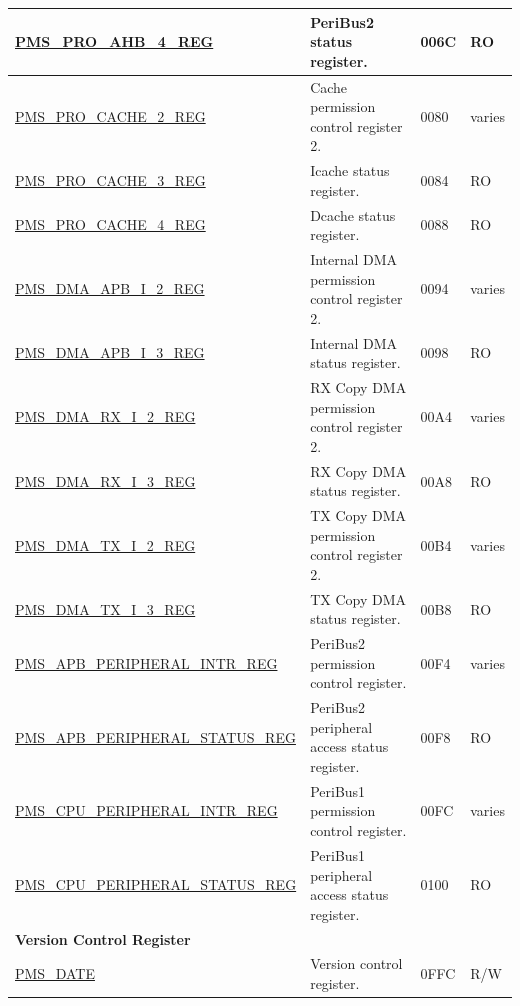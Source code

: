 \begin{longtable}{ |m{6cm} |m{7.2cm} | m{1.3cm} |m{1cm} | }
\hyperref[regdesc:PMSPROAHB4REG]{PMS\_PRO\_AHB\_4\_REG} & PeriBus2 status register. & \hexprefix{}006C & RO \\ \hline
\hyperref[regdesc:PMSPROCACHE2REG]{PMS\_PRO\_CACHE\_2\_REG} & Cache permission control register 2. & \hexprefix{}0080 & varies \\ \hline
\hyperref[regdesc:PMSPROCACHE3REG]{PMS\_PRO\_CACHE\_3\_REG} & Icache status register. & \hexprefix{}0084 & RO \\ \hline
\hyperref[regdesc:PMSPROCACHE4REG]{PMS\_PRO\_CACHE\_4\_REG} & Dcache status register. & \hexprefix{}0088 & RO \\ \hline
\hyperref[regdesc:PMSDMAAPBI2REG]{PMS\_DMA\_APB\_I\_2\_REG} & Internal DMA permission control register 2. & \hexprefix{}0094 & varies \\ \hline
\hyperref[regdesc:PMSDMAAPBI3REG]{PMS\_DMA\_APB\_I\_3\_REG} & Internal DMA status register. & \hexprefix{}0098 & RO \\ \hline
\hyperref[regdesc:PMSDMARXI2REG]{PMS\_DMA\_RX\_I\_2\_REG} & RX Copy DMA permission control register 2. & \hexprefix{}00A4 & varies \\ \hline
\hyperref[regdesc:PMSDMARXI3REG]{PMS\_DMA\_RX\_I\_3\_REG} & RX Copy DMA status register. & \hexprefix{}00A8 & RO \\ \hline
\hyperref[regdesc:PMSDMATXI2REG]{PMS\_DMA\_TX\_I\_2\_REG} & TX Copy DMA permission control register 2. & \hexprefix{}00B4 & varies \\ \hline
\hyperref[regdesc:PMSDMATXI3REG]{PMS\_DMA\_TX\_I\_3\_REG} & TX Copy DMA status register. & \hexprefix{}00B8 & RO \\ \hline
\hyperref[regdesc:PMSAPBPERIPHERALINTRREG]{PMS\_APB\_PERIPHERAL\_INTR\_REG} & PeriBus2 permission control register. & \hexprefix{}00F4 & varies \\ \hline
\hyperref[regdesc:PMSAPBPERIPHERALSTATUSREG]{PMS\_APB\_PERIPHERAL\_STATUS\_REG} & PeriBus2 peripheral access status register. & \hexprefix{}00F8 & RO \\ \hline
\hyperref[regdesc:PMSCPUPERIPHERALINTRREG]{PMS\_CPU\_PERIPHERAL\_INTR\_REG} & PeriBus1 permission control register. & \hexprefix{}00FC & varies \\ \hline
\hyperref[regdesc:PMSCPUPERIPHERALSTATUSREG]{PMS\_CPU\_PERIPHERAL\_STATUS\_REG} & PeriBus1 peripheral access status register. & \hexprefix{}0100 & RO \\ \hline
\multicolumn{4}{|l|}{\textbf{Version Control Register}} \\ \hline
\hyperref[regdesc:PMSDATEREG]{PMS\_DATE} & Version control register. & \hexprefix{}0FFC & R/W \\ \hline
\end{longtable}
